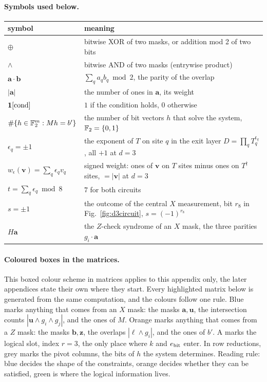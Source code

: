 \paragraph{Symbols used below.}
\begin{center}\small
\begin{tabular}{ll}\toprule
symbol & meaning \\\midrule
$\oplus$ & bitwise XOR of two masks, or addition mod 2 of two bits \\
$\wedge$ & bitwise AND of two masks (entrywise product) \\
$\boldsymbol a\cdot\boldsymbol b$ & $\sum_q a_qb_q \bmod 2$, the parity of the overlap \\
$|\boldsymbol a|$ & the number of ones in $\boldsymbol a$, its weight \\
$\mathbf1\!\left[\text{cond}\right]$ & $1$ if the condition holds, $0$ otherwise \\
$\#\{h\in\mathbb F_2^m: Mh=b'\}$ & the number of bit vectors $h$ that solve the system, $\mathbb F_2=\{0,1\}$ \\
$\epsilon_q=\pm1$ & the exponent of $T$ on site $q$ in the exit layer $D=\prod_qT_q^{\epsilon_q}$, all $+1$ at $d=3$ \\
$w_\epsilon(\boldsymbol v)=\sum_q\epsilon_qv_q$ & signed weight: ones of $\boldsymbol v$ on $T$ sites minus ones on $T^\dagger$ sites, $=|\boldsymbol v|$ at $d=3$ \\
$t=\sum_q\epsilon_q\bmod8$ & $7$ for both circuits \\
$s=\pm1$ & the outcome of the central $X$ measurement, bit $r_8$ in Fig.~\ref{fig:d3circuit}, $s=(-1)^{r_8}$ \\
$H\boldsymbol a$ & the $Z$-check syndrome of an $X$ mask, the three parities $g_i\cdot\boldsymbol a$ \\
\bottomrule
\end{tabular}
\end{center}

\paragraph{Coloured boxes in the matrices.} This boxed colour scheme in matrices applies to this appendix only, the later appendices state their own where they start. Every highlighted matrix below is generated from the same computation, and the colours follow one rule. \colorbox{tnblue!22}{Blue} marks anything that comes from an $X$ mask: the masks $\boldsymbol a,\boldsymbol u$, the intersection counts $|\boldsymbol u\wedge g_i\wedge g_j|$, and the ones of $M$. \colorbox{tnorange!22}{Orange} marks anything that comes from a $Z$ mask: the masks $\boldsymbol b,\boldsymbol z$, the overlaps $|\ell\wedge g_i|$, and the ones of $b'$. A  marks the logical slot, index $r=3$, the only place where $k$ and $e_{\rm bit}$ enter. In row reductions, \colorbox{black!22}{grey} marks the pivot columns, the bits of $h$ the system determines. Reading rule: blue decides the shape of the constraints, orange decides whether they can be satisfied, green is where the logical information lives.

